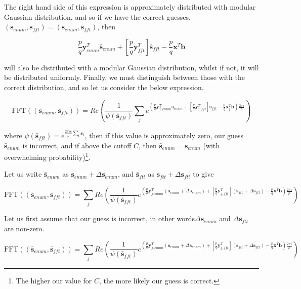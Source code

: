 \documentclass[a4paper, 10pt]{article}
\theoremstyle{definition}
\begin{document}
The right hand side of this expression is approximately distributed with modular Gaussian distribution, and so if we have the correct guesses, $(\bar{\mathbf{s}}_{enum}, \bar{\mathbf{s}}_{fft}) = (\mathbf{s}_{enum}, \mathbf{s}_{fft})$, then 

\[\frac{p}{q}\mathbf{y}^T_{enum}\bar{\mathbf{s}}_{enum} + \left[\frac{p}{q}\mathbf{y}^T_{fft}\right]\bar{\mathbf{s}}_{fft} - \frac{p}{q}\mathbf{x}^T\mathbf{b}\]

will also be distributed with a modular Gaussian distribution, whilst if not, it will be distributed uniformly. Finally, we must distinguish between those with the correct distribution, and so let us consider the below expression.

\[\mbox{FFT}((\bar{\mathbf{s}}_{enum}, \bar{\mathbf{s}}_{fft})) = Re(\frac{1}{\psi (\bar{\mathbf{s}}_{fft})}\sum_j e^{(\frac{p}{q}\mathbf{y}^T_{j,enum}\bar{\mathbf{s}}_{enum} + \left[\frac{p}{q}\mathbf{y}^T_{j,fft}\right]\bar{\mathbf{s}}_{fft} - \frac{p}{q}\mathbf{x}^T_j\mathbf{b})\frac{2\pi i}{p}})\]

where $\psi (\bar{\mathbf{s}}_{fft}) = e^{\frac{2\pi i c}{p}\sum_t\mathbf{s}_t}$, then if this value is approximately zero, our guess $\bar{\mathbf{s}}_{enum}$ is incorrect, and if above the cutoff $C$, then $\bar{\mathbf{s}}_{enum} = \mathbf{s}_{enum}$ (with overwhelming probability)\footnote{The higher our value for $C$, the more likely our guess is correct.}.

Let us write $\bar{\mathbf{s}}_{enum}$ as $\mathbf{s}_{enum} + \Delta \mathbf{s}_{enum}$, and $\bar{\mathbf{s}}_{ftt}$ as $\mathbf{s}_{ftt} + \Delta \mathbf{s}_{ftt}$ to give

\[\mbox{FFT}((\bar{\mathbf{s}}_{enum}, \bar{\mathbf{s}}_{fft})) = \sum_j Re(\frac{1}{\psi (\bar{\mathbf{s}}_{fft})}e^{(\frac{p}{q}\mathbf{y}^T_{j, enum}(\mathbf{s}_{enum} + \Delta \mathbf{s}_{enum}) + \left[\frac{p}{q}\mathbf{y}^T_{j, fft}\right](\mathbf{s}_{ftt} + \Delta \mathbf{s}_{ftt}) - \frac{p}{q}\mathbf{x}^T\mathbf{b})\frac{2\pi i}{p}})\]

Let us first assume that our guess is incorrect, in other words$\Delta \mathbf{s}_{enum}$ and $\Delta \mathbf{s}_{ftt}$ are non-zero.


\[\mbox{FFT}((\bar{\mathbf{s}}_{enum}, \bar{\mathbf{s}}_{fft})) = \sum_j Re(\frac{1}{\psi (\bar{\mathbf{s}}_{fft})}e^{(\frac{p}{q}\mathbf{y}^T_{j, enum}(\mathbf{s}_{enum} + \Delta \mathbf{s}_{enum}) + \left[\frac{p}{q}\mathbf{y}^T_{j, fft}\right](\mathbf{s}_{ftt} + \Delta \mathbf{s}_{ftt}) - \frac{p}{q}\mathbf{x}^T\mathbf{b})\frac{2\pi i}{p}})\]
    
\end{document}
